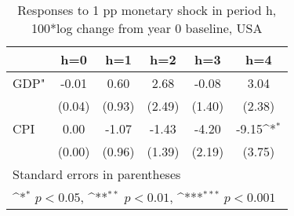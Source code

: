 \begin{table}[htbp]\centering
\def\sym#1{\ifmmode^{#1}\else\(^{#1}\)\fi}
\caption{Responses to 1 pp monetary shock in period h, 100*log change from year 0 baseline, USA}
\begin{tabular}{l*{5}{c}}
\hline\hline
            &\multicolumn{1}{c}{h=0}&\multicolumn{1}{c}{h=1}&\multicolumn{1}{c}{h=2}&\multicolumn{1}{c}{h=3}&\multicolumn{1}{c}{h=4}\\
\hline
GDP"        &       -0.01         &        0.60         &        2.68         &       -0.08         &        3.04         \\
            &      (0.04)         &      (0.93)         &      (2.49)         &      (1.40)         &      (2.38)         \\
[1em]
CPI         &        0.00         &       -1.07         &       -1.43         &       -4.20         &       -9.15\sym{*}  \\
            &      (0.00)         &      (0.96)         &      (1.39)         &      (2.19)         &      (3.75)         \\
\hline\hline
\multicolumn{6}{l}{\footnotesize Standard errors in parentheses}\\
\multicolumn{6}{l}{\footnotesize \sym{*} \(p<0.05\), \sym{**} \(p<0.01\), \sym{***} \(p<0.001\)}\\
\end{tabular}
\end{table}
